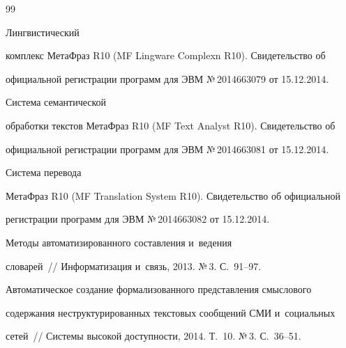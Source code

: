 {{\begin{thebibliography}{99}


 Лингвистический 


комплекс МетаФраз R10 (MF Lingware Complexn R10). Свидетельство об 


официальной регистрации программ для ЭВМ №\,2014663079 от 15.12.2014.







 Система семантической 


обработки текстов МетаФраз R10 (MF Text Analyst R10). Свидетельство об 


официальной регистрации программ для ЭВМ №\,2014663081 от 15.12.2014.







 Система перевода 


МетаФраз R10 (MF Translation System R10). Свидетельство об официальной 


регистрации программ для ЭВМ №\,2014663082 от 15.12.2014.










 Методы автоматизированного составления и~ведения 


словарей~/\!\!/ Информатизация и~связь, 2013. №\,3. С.~91--97.









Автоматическое создание формализованного представления смыслового 


содержания неструктурированных текстовых сообщений СМИ и~социальных 


сетей~/\!\!/ Системы высокой доступности, 2014. Т.~10. №\,3. С.~36--51.








\end{thebibliography}}}
